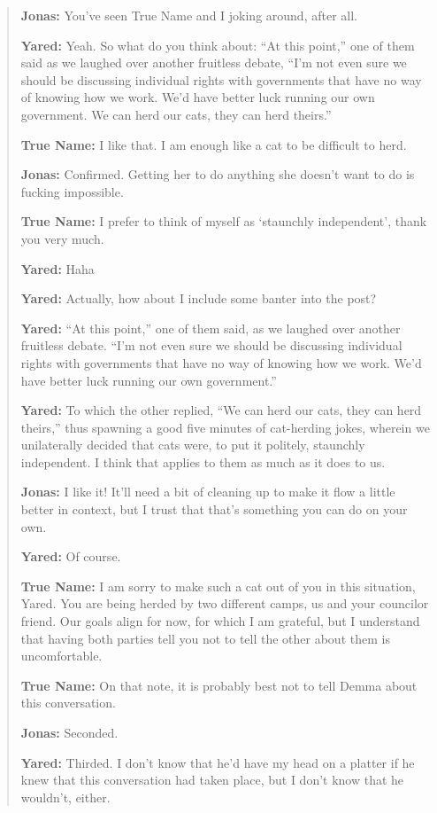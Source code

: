 \begin{quote}
\textbf{Jonas:} You've seen True Name and I joking around, after all.

\textbf{Yared:} Yeah. So what do you think about: ``At this point,'' one of them said as we laughed over another fruitless debate, ``I'm not even sure we should be discussing individual rights with governments that have no way of knowing how we work. We'd have better luck running our own government. We can herd our cats, they can herd theirs.''

\textbf{True Name:} I like that. I am enough like a cat to be difficult to herd.

\textbf{Jonas:} Confirmed. Getting her to do anything she doesn't want to do is fucking impossible.

\textbf{True Name:} I prefer to think of myself as `staunchly independent', thank you very much.

\textbf{Yared:} Haha

\textbf{Yared:} Actually, how about I include some banter into the post?

\textbf{Yared:} ``At this point,'' one of them said, as we laughed over another fruitless debate. ``I'm not even sure we should be discussing individual rights with governments that have no way of knowing how we work. We'd have better luck running our own government.''

\textbf{Yared:} To which the other replied, ``We can herd our cats, they can herd theirs,'' thus spawning a good five minutes of cat-herding jokes, wherein we unilaterally decided that cats were, to put it politely, staunchly independent. I think that applies to them as much as it does to us.

\textbf{Jonas:} I like it! It'll need a bit of cleaning up to make it flow a little better in context, but I trust that that's something you can do on your own.

\textbf{Yared:} Of course.

\textbf{True Name:} I am sorry to make such a cat out of you in this situation, Yared. You are being herded by two different camps, us and your councilor friend. Our goals align for now, for which I am grateful, but I understand that having both parties tell you not to tell the other about them is uncomfortable.

\textbf{True Name:} On that note, it is probably best not to tell Demma about this conversation.

\textbf{Jonas:} Seconded.

\textbf{Yared:} Thirded. I don't know that he'd have my head on a platter if he knew that this conversation had taken place, but I don't know that he wouldn't, either.


\end{quote}
